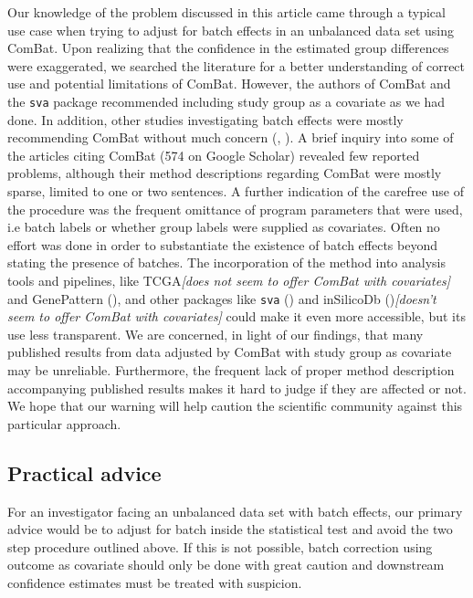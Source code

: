 \documentclass{bio}
\newcommand\COMMENT[2]{\textcolor{COMMENTcol}{#1}\NOTE{#2}}
\newcommand\NB[1]{\textcolor{NBcol}{\textit{#1}}}
\newcommand\NOTE[1]{\NB{[#1]}}
\begin{document}
Our knowledge of the problem discussed in this article came through a typical use case when trying to adjust for batch effects in an unbalanced data set using ComBat. Upon realizing that the confidence in the estimated group differences were exaggerated, we searched the literature for a better understanding of correct use and potential limitations of ComBat. However, the authors of ComBat and the \texttt{sva} package recommended including study group as a covariate as we had done. In addition, other studies investigating batch effects were mostly recommending ComBat without much concern (\citealp{Kupfer2012}, \citealp{Kitchen2011}). A brief inquiry into  some of the articles citing ComBat (574 on Google Scholar) revealed few reported problems, although their method descriptions regarding ComBat were mostly sparse, limited to one or two sentences. A further indication of the carefree use of the procedure was the frequent omittance of program parameters that were used, i.e batch labels or whether group labels were supplied as covariates. Often no effort was done in order to substantiate the existence of batch effects beyond stating the presence of batches. The incorporation of the method into analysis tools and pipelines, like \COMMENT{TCGA}{does not seem to offer ComBat with covariates} and GenePattern (\citealp{Reich2006}), and other packages like \texttt{sva} (\citealp{Leek2012}) and \COMMENT{inSilicoDb (\citealp{Taminau2011})}{doesn't seem to offer ComBat with covariates} could make it even more accessible, but its use less transparent. We are concerned, in light of our findings, that many published results from data adjusted by ComBat with study group as covariate may be unreliable. Furthermore, the frequent lack of proper method description accompanying published results makes it hard to judge if they are affected or not. We hope that our warning will help caution the scientific community against this particular approach.


\subsection{Practical advice}

For an investigator facing an unbalanced data set with batch effects, our primary advice would be to adjust for batch inside the statistical test and avoid the two step procedure outlined above. If this is not possible, batch correction using outcome as covariate should only be done with great caution and downstream confidence estimates must be treated with suspicion.
\end{document}
